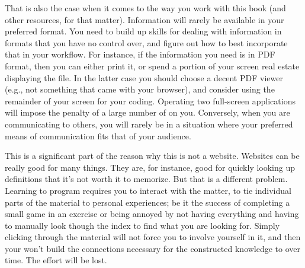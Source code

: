 That is also the case when it comes to the way you work with this book (and other resources, for that matter). Information will rarely be available in your preferred format. You need to build up skills for dealing with information in formats that you have no control over, and figure out how to best incorporate that in your workflow. For instance, if the information you need is in PDF format, then you can either print it, or spend a portion of your screen real estate displaying the file. In the latter case you should choose a decent PDF viewer (e.g., not something that came with your browser), and consider using the remainder of your screen for your coding. Operating two full-screen applications will impose the penalty of a large number of  on you. Conversely, when you are communicating to others, you will rarely be in a situation where your preferred means of communication fits that of your audience.

This is a significant part of the reason why this is not a website. Websites can be really good for many things. They are, for instance, good for quickly looking up definitions that it's not worth it to memorize. But that is a different problem. Learning to program requires you to interact with the matter, to tie individual parts of the material to personal experiences; be it the success of completing a small game in an exercise or being annoyed by not having everything  and having to manually look though the index to find what you are looking for. Simply clicking through the material will not force you to involve yourself in it, and then your  won't build the connections necessary for the constructed knowledge to  over time. The effort will be lost.

